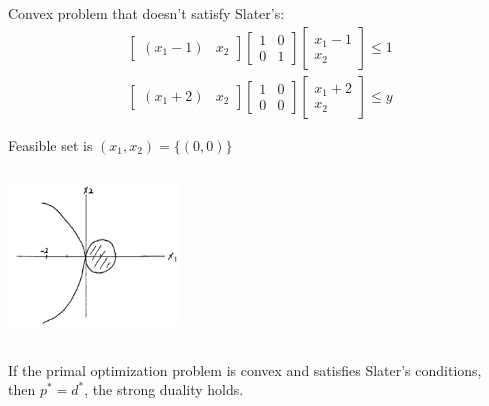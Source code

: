 \begin{example}
	Convex problem that doesn't satisfy Slater's:
	\begin{align*}
		\begin{bmatrix}
			(x_1-1) & x_2
		\end{bmatrix}\begin{bmatrix}
			1&0\\
			0&1
		\end{bmatrix}\begin{bmatrix}
			x_1 - 1\\
			x_2
		\end{bmatrix}\leq 1\\
		\begin{bmatrix}
			(x_1+2) & x_2
		\end{bmatrix}\begin{bmatrix}
			1&0\\
			0&0
		\end{bmatrix}\begin{bmatrix}
			x_1 + 2\\
			x_2
		\end{bmatrix}\leq y
	\end{align*}
\end{example}

Feasible set is $(x_1, x_2) = \{(0,0) \}$

\begin{marginfigure}
	\centering
	\includegraphics[width=1.8in,height=1.8in]{figures/ch10/figure1125_1.png}
\end{marginfigure}

\begin{theorem}
	If the primal optimization problem is convex and satisfies Slater's conditions, then $p^* = d^*$, the strong duality holds.
\end{theorem}

